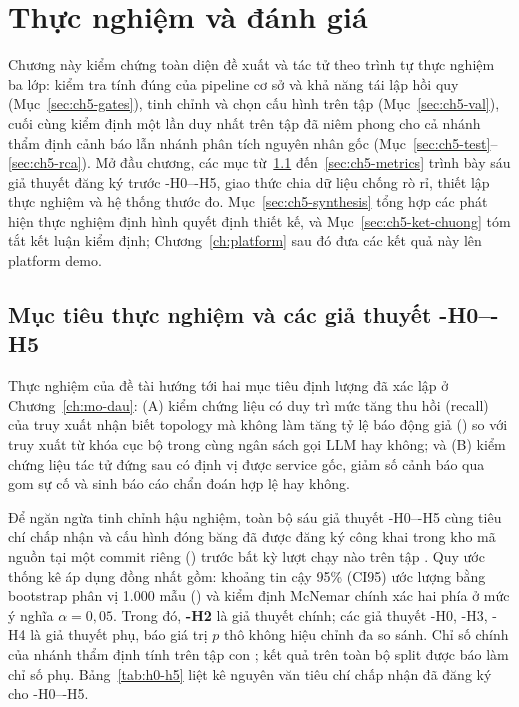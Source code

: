 
\section{Thực nghiệm và đánh giá}
\label{ch:thuc-nghiem}

Chương này kiểm chứng toàn diện đề xuất \CTAV{} và tác tử  theo trình tự thực nghiệm ba lớp: kiểm tra tính đúng của pipeline cơ sở và khả năng tái lập hồi quy (Mục~\ref{sec:ch5-gates}), tinh chỉnh và chọn cấu hình trên tập  (Mục~\ref{sec:ch5-val}), cuối cùng kiểm định một lần duy nhất trên tập  đã niêm phong cho cả nhánh thẩm định cảnh báo lẫn nhánh phân tích nguyên nhân gốc (Mục~\ref{sec:ch5-test}--\ref{sec:ch5-rca}). Mở đầu chương, các mục từ~\ref{sec:ch5-hypotheses} đến~\ref{sec:ch5-metrics} trình bày sáu giả thuyết đăng ký trước \hyp{H0}--\hyp{H5}, giao thức chia dữ liệu chống rò rỉ, thiết lập thực nghiệm và hệ thống thước đo. Mục~\ref{sec:ch5-synthesis} tổng hợp các phát hiện thực nghiệm định hình quyết định thiết kế, và Mục~\ref{sec:ch5-ket-chuong} tóm tắt kết luận kiểm định; Chương~\ref{ch:platform} sau đó đưa các kết quả này lên platform demo.

\subsection{Mục tiêu thực nghiệm và các giả thuyết \hyp{H0}--\hyp{H5}}
\label{sec:ch5-hypotheses}

Thực nghiệm của đề tài hướng tới hai mục tiêu định lượng đã xác lập ở Chương~\ref{ch:mo-dau}: (A) kiểm chứng liệu \CTAV{} có duy trì mức tăng thu hồi (recall) của truy xuất nhận biết topology mà không làm tăng tỷ lệ báo động giả () so với truy xuất từ khóa cục bộ  trong cùng ngân sách gọi LLM hay không; và (B) kiểm chứng liệu tác tử  đứng sau \CTAV{} có định vị được service gốc, giảm số cảnh báo qua gom sự cố và sinh báo cáo chẩn đoán hợp lệ hay không.

Để ngăn ngừa tinh chỉnh hậu nghiệm, toàn bộ sáu giả thuyết \hyp{H0}--\hyp{H5} cùng tiêu chí chấp nhận và cấu hình đóng băng đã được đăng ký công khai trong kho mã nguồn tại một commit riêng () trước bất kỳ lượt chạy nào trên tập . Quy ước thống kê áp dụng đồng nhất gồm: khoảng tin cậy 95\% (CI95) ước lượng bằng bootstrap phân vị 1.000 mẫu () và kiểm định McNemar chính xác hai phía ở mức ý nghĩa $\alpha = 0{,}05$. Trong đó, \textbf{\hyp{H2}} là giả thuyết chính; các giả thuyết \hyp{H0}, \hyp{H3}, \hyp{H4} là giả thuyết phụ, báo giá trị $p$ thô không hiệu chỉnh đa so sánh. Chỉ số chính của nhánh thẩm định tính trên tập con \emph{}; kết quả trên toàn bộ split được báo làm chỉ số phụ. Bảng~\ref{tab:h0-h5} liệt kê nguyên văn tiêu chí chấp nhận đã đăng ký cho \hyp{H0}--\hyp{H5}.

